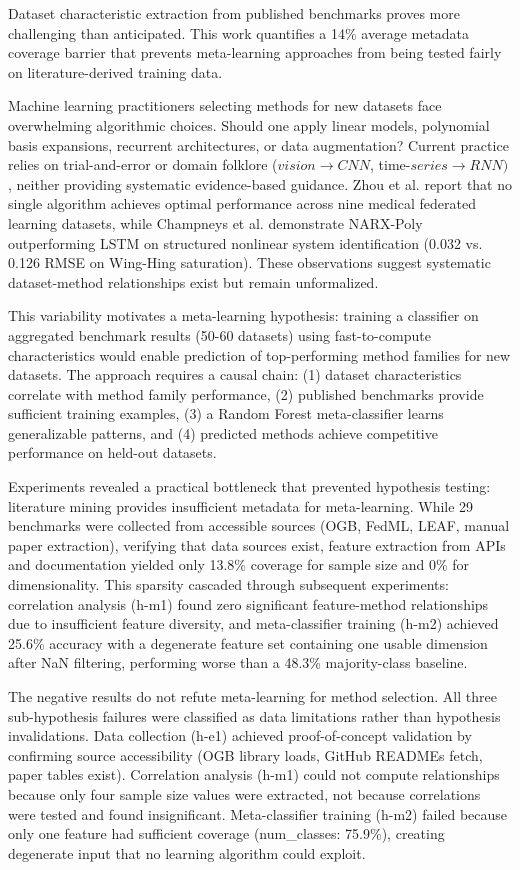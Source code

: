 
Dataset characteristic extraction from published benchmarks proves more challenging than anticipated. This work quantifies a 14\% average metadata coverage barrier that prevents meta-learning approaches from being tested fairly on literature-derived training data.

Machine learning practitioners selecting methods for new datasets face overwhelming algorithmic choices. Should one apply linear models, polynomial basis expansions, recurrent architectures, or data augmentation? Current practice relies on trial-and-error or domain folklore ($vision\rightarrow CNN$, time-$series\rightarrow RNN)$, neither providing systematic evidence-based guidance. Zhou et al. report that no single algorithm achieves optimal performance across nine medical federated learning datasets, while Champneys et al. demonstrate NARX-Poly outperforming LSTM on structured nonlinear system identification (0.032 vs. 0.126 RMSE on Wing-Hing saturation). These observations suggest systematic dataset-method relationships exist but remain unformalized.

This variability motivates a meta-learning hypothesis: training a classifier on aggregated benchmark results (50-60 datasets) using fast-to-compute characteristics would enable prediction of top-performing method families for new datasets. The approach requires a causal chain: (1) dataset characteristics correlate with method family performance, (2) published benchmarks provide sufficient training examples, (3) a Random Forest meta-classifier learns generalizable patterns, and (4) predicted methods achieve competitive performance on held-out datasets.

Experiments revealed a practical bottleneck that prevented hypothesis testing: literature mining provides insufficient metadata for meta-learning. While 29 benchmarks were collected from accessible sources (OGB, FedML, LEAF, manual paper extraction), verifying that data sources exist, feature extraction from APIs and documentation yielded only 13.8\% coverage for sample size and 0\% for dimensionality. This sparsity cascaded through subsequent experiments: correlation analysis (h-m1) found zero significant feature-method relationships due to insufficient feature diversity, and meta-classifier training (h-m2) achieved 25.6\% accuracy with a degenerate feature set containing one usable dimension after NaN filtering, performing worse than a 48.3\% majority-class baseline.

The negative results do not refute meta-learning for method selection. All three sub-hypothesis failures were classified as data limitations rather than hypothesis invalidations. Data collection (h-e1) achieved proof-of-concept validation by confirming source accessibility (OGB library loads, GitHub READMEs fetch, paper tables exist). Correlation analysis (h-m1) could not compute relationships because only four sample size values were extracted, not because correlations were tested and found insignificant. Meta-classifier training (h-m2) failed because only one feature had sufficient coverage (num\_classes: 75.9\%), creating degenerate input that no learning algorithm could exploit.

